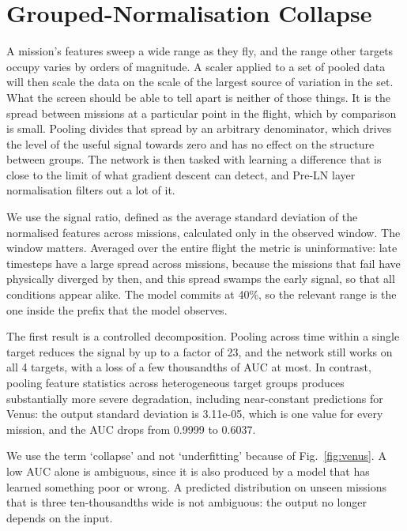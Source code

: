 \documentclass[preprint,12pt,authoryear,doubleblind]{elsarticle}
\begin{document}
\section{Grouped-Normalisation Collapse}
\label{sec:collapse}

A mission's features sweep a wide range as they fly, and the range other targets occupy varies by orders of magnitude. A scaler applied to a set of pooled data will then scale the data on the scale of the largest source of variation in the set. What the screen should be able to tell apart is neither of those things. It is the spread between missions at a particular point in the flight, which by comparison is small. Pooling divides that spread by an arbitrary denominator, which drives the level of the useful signal towards zero and has no effect on the structure between groups. The network is then tasked with learning a difference that is close to the limit of what gradient descent can detect, and Pre-LN layer normalisation filters out a lot of it.

We use the signal ratio, defined as the average standard deviation of the normalised features across missions, calculated only in the observed window. The window matters. Averaged over the entire flight the metric is uninformative: late timesteps have a large spread across missions, because the missions that fail have physically diverged by then, and this spread swamps the early signal, so that all conditions appear alike. The model commits at 40\%, so the relevant range is the one inside the prefix that the model observes.

The first result is a controlled decomposition. Pooling across time within a single target reduces the signal by up to a factor of 23, and the network still works on all 4 targets, with a loss of a few thousandths of AUC at most. In contrast, pooling feature statistics across heterogeneous target groups produces substantially more severe degradation, including near-constant predictions for Venus: the output standard deviation is 3.11e-05, which is one value for every mission, and the AUC drops from 0.9999 to 0.6037.

We use the term `collapse' and not `underfitting' because of Fig.~\ref{fig:venus}. A low AUC alone is ambiguous, since it is also produced by a model that has learned something poor or wrong. A predicted distribution on unseen missions that is three ten-thousandths wide is not ambiguous: the output no longer depends on the input.
\end{document}
